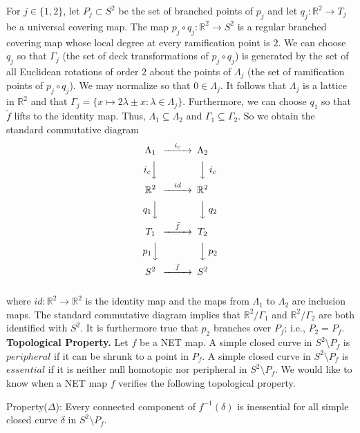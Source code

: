 \documentclass[article,dvisp]{amsart}
\def\R{\mathbb{R}}
\theoremstyle{definition}
\theoremstyle{remark}
\numberwithin{equation}{section}
\theoremstyle{lemma}
\begin{document}
For $j\in\{1,2\}$, let $P_{j}\subset S^2$ be the set of branched points of $p_{j}$  and let $q_{j}:\R^2\to T_{j}$ be a universal covering map. The map $p_{j}\circ q_{j}:\R^2\to S^2$ is a regular branched covering map whose local degree at every ramification point is $2$. We can choose $q_{j}$ so that $\Gamma_{j}$ (the set of deck transformations of $p_{j}\circ q_{j}$) is generated by the set of all Euclidean rotations of order $2$ about the points of $\Lambda_{j}$ (the set of ramification points of $p_{j}\circ q_{j}$). We may normalize so that $0\in\Lambda_{j}$. It follows that $\Lambda_{j}$ is a lattice in $\R^2$ and that $\Gamma_{j}=\{x\mapsto2\lambda\pm x:\lambda\in\Lambda_{j}\}$. Furthermore, we can choose $q_{1}$ so that $\tilde{f}$ lifts to the identity map. Thus, $\Lambda_{1}\subseteq\Lambda_{2}$ and $\Gamma_{1}\subseteq\Gamma_{2}$. So we obtain the standard commutative diagram
$$\begin{CD}
\Lambda_{1}@>{i_{c}}>>\Lambda_{2}\\
{i_{c}}@VVV      @VVV{i_{c}}\\
\R^2@>id>>\R^2\\
{q_{1}}@VVV      @VVV{q_{2}}\\
T_{1}@>{\tilde{f}}>>T_{2}\\
{p_{1}}@VVV      @VVV{p_{2}}\\
S^2@>f>>S^2
\end{CD}$$\\
where $id:\R^2\to\R^2$ is the identity map and the maps from $\Lambda_{1}$ to $\Lambda_{2}$ are inclusion maps. The standard commutative diagram implies that $\R^2/\Gamma_{1}$ and $\R^2/\Gamma_{2}$ are both identified with $S^{2}$. It is furthermore true that $p_{2}$ branches over $P_{f}$; i.e., $P_{2}=P_{f}$.\vspace{.1in}\\
\textbf{Topological Property.} Let $f$ be a NET map. A simple closed curve in $S^{2}\setminus P_{f}$ is $peripheral$ if it can be shrunk to a point in $P_{f}$. A simple closed curve in $S^{2}\setminus P_{f}$ is $essential$ if it is neither null homotopic nor peripheral in $S^{2}\setminus P_{f}$. We would like to know when a NET map $f$ verifies the following topological property.

Property($\Delta$): Every connected component of $f^{-1}(\delta)$ is inessential for all simple closed curve $\delta$ in $S^{2}\setminus P_{f}$.
\end{document}
